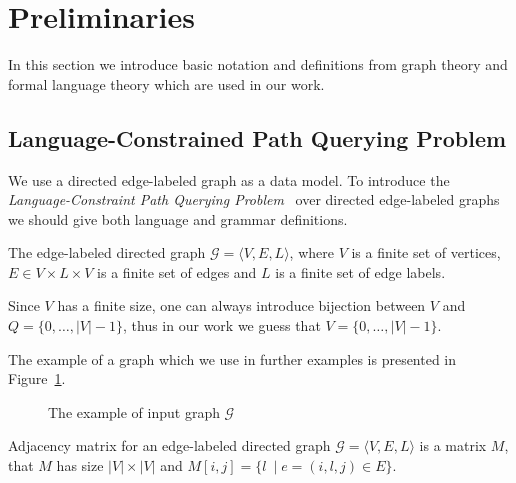 \section{Preliminaries}

In this section we introduce basic notation and definitions from graph theory and formal language theory which are used in our work.

\subsection{Language-Constrained Path Querying Problem}

We use a directed edge-labeled graph as a data model.
To introduce the \textit{Language-Constraint Path Querying Problem}~\cite{!!!} over directed edge-labeled graphs we should give both language and grammar definitions.

\begin{definition}
The edge-labeled directed graph $\mathcal{G} = \langle V,E,L \rangle$, where $V$ is a finite set of vertices, $E \in V \times L \times V$ is a finite set of edges and $L$ is a finite set of edge labels.
\end{definition}

Since $V$ has a finite size, one can always introduce bijection between $V$ and $Q = \{0, \ldots, |V|-1\}$, thus in our work we guess that $V = \{0, \ldots, |V|-1\}$.

The example of a graph which we use in further examples is presented in Figure~\ref{fig:example_input_graph}.

\begin{figure}[h]
    \centering
    \caption{The example of input graph $\mathcal{G}$}
    \label{fig:example_input_graph}
\end{figure}

\begin{definition}
Adjacency matrix for an edge-labeled directed graph $\mathcal{G} = \langle V,E,L \rangle$ is a matrix $M$, that $M$ has size $|V|\times|V|$ and $M[i,j] = \{l~\mid e = (i,l,j) \in E\}$.
\end{definition}

